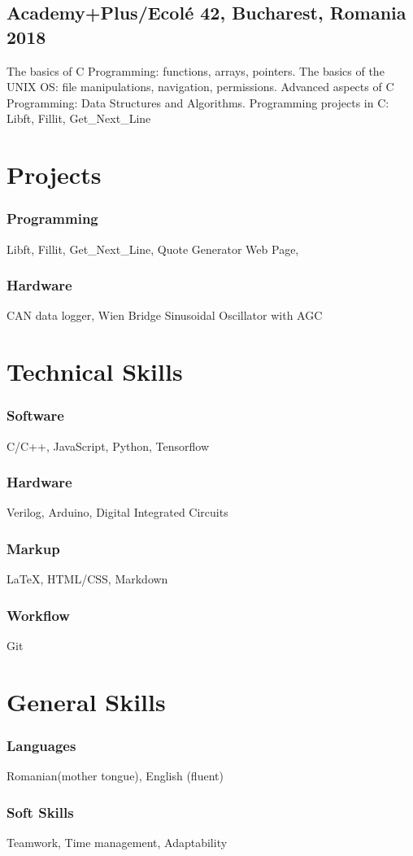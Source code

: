 \documentclass{article}
\begin{document}
\subsection{Academy+Plus/Ecol{\'e} 42, Bucharest, Romania 2018}
The basics of C Programming: functions, arrays, pointers.
The basics of the UNIX OS: file manipulations, navigation, permissions.
Advanced aspects of C Programming: Data Structures and Algorithms.
Programming projects in C: Libft, Fillit, Get\_Next\_Line

\section{Projects}
\subsubsection{Programming}
Libft, Fillit, Get\_Next\_Line, Quote Generator Web Page,  
\subsubsection{Hardware}
CAN data logger, Wien Bridge Sinusoidal Oscillator with AGC


\section{Technical Skills}
\subsubsection{Software}
C/C++, JavaScript, Python, Tensorflow
\subsubsection{Hardware}
Verilog, Arduino, Digital Integrated Circuits
\subsubsection{Markup}
{\LaTeX}, HTML/CSS, Markdown
\subsubsection{Workflow}
Git

\section{General Skills}
\subsubsection{Languages}
Romanian(mother tongue), English (fluent)
\subsubsection{Soft Skills}
Teamwork, Time management, Adaptability
\end{document}
